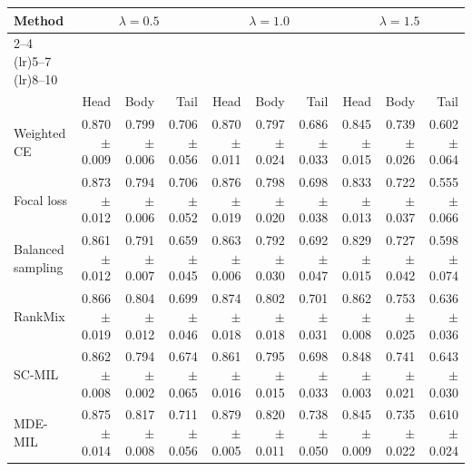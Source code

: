 \begin{tabular}{lrrrrrrrrr}
\toprule
Method & \multicolumn{3}{c}{$\lambda=0.5$} & \multicolumn{3}{c}{$\lambda=1.0$} & \multicolumn{3}{c}{$\lambda=1.5$} \\ \cmidrule(lr){2--4} \cmidrule(lr){5--7} \cmidrule(lr){8--10}\\
 & Head & Body & Tail & Head & Body & Tail & Head & Body & Tail\\
\midrule
Weighted CE & \num{0.870} $\pm$ \num{0.009} & \num{0.799} $\pm$ \num{0.006} & \num{0.706} $\pm$ \num{0.056} & \num{0.870} $\pm$ \num{0.011} & \num{0.797} $\pm$ \num{0.024} & \num{0.686} $\pm$ \num{0.033} & \num{0.845} $\pm$ \num{0.015} & \num{0.739} $\pm$ \num{0.026} & \num{0.602} $\pm$ \num{0.064}\\
Focal loss & \num{0.873} $\pm$ \num{0.012} & \num{0.794} $\pm$ \num{0.006} & \num{0.706} $\pm$ \num{0.052} & \num{0.876} $\pm$ \num{0.019} & \num{0.798} $\pm$ \num{0.020} & \num{0.698} $\pm$ \num{0.038} & \num{0.833} $\pm$ \num{0.013} & \num{0.722} $\pm$ \num{0.037} & \num{0.555} $\pm$ \num{0.066}\\
Balanced sampling & \num{0.861} $\pm$ \num{0.012} & \num{0.791} $\pm$ \num{0.007} & \num{0.659} $\pm$ \num{0.045} & \num{0.863} $\pm$ \num{0.006} & \num{0.792} $\pm$ \num{0.030} & \num{0.692} $\pm$ \num{0.047} & \num{0.829} $\pm$ \num{0.015} & \num{0.727} $\pm$ \num{0.042} & \num{0.598} $\pm$ \num{0.074}\\
RankMix & \num{0.866} $\pm$ \num{0.019} & \num{0.804} $\pm$ \num{0.012} & \num{0.699} $\pm$ \num{0.046} & \num{0.874} $\pm$ \num{0.018} & \num{0.802} $\pm$ \num{0.018} & \num{0.701} $\pm$ \num{0.031} & \num{0.862} $\pm$ \num{0.008} & \num{0.753} $\pm$ \num{0.025} & \num{0.636} $\pm$ \num{0.036}\\
SC-MIL & \num{0.862} $\pm$ \num{0.008} & \num{0.794} $\pm$ \num{0.002} & \num{0.674} $\pm$ \num{0.065} & \num{0.861} $\pm$ \num{0.016} & \num{0.795} $\pm$ \num{0.015} & \num{0.698} $\pm$ \num{0.033} & \num{0.848} $\pm$ \num{0.003} & \num{0.741} $\pm$ \num{0.021} & \num{0.643} $\pm$ \num{0.030}\\
MDE-MIL & \num{0.875} $\pm$ \num{0.014} & \num{0.817} $\pm$ \num{0.008} & \num{0.711} $\pm$ \num{0.056} & \num{0.879} $\pm$ \num{0.005} & \num{0.820} $\pm$ \num{0.011} & \num{0.738} $\pm$ \num{0.050} & \num{0.845} $\pm$ \num{0.009} & \num{0.735} $\pm$ \num{0.022} & \num{0.610} $\pm$ \num{0.024}\\
\bottomrule
\end{tabular}
